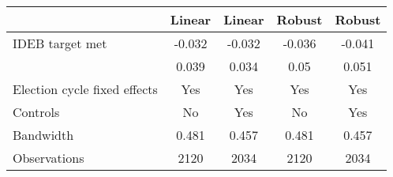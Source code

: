 \begin{tabular}{lcccc}
  \toprule
 & Linear & Linear & Robust & Robust \\ 
  \midrule
IDEB target met & -0.032 & -0.032 & -0.036 & -0.041 \\ 
   & 0.039 & 0.034 & 0.05 & 0.051 \\ 
  Election cycle fixed effects & Yes & Yes & Yes & Yes \\ 
  Controls & No & Yes & No & Yes \\ 
  Bandwidth & 0.481 & 0.457 & 0.481 & 0.457 \\ 
  Observations & 2120 & 2034 & 2120 & 2034 \\ 
   \bottomrule
\end{tabular}
